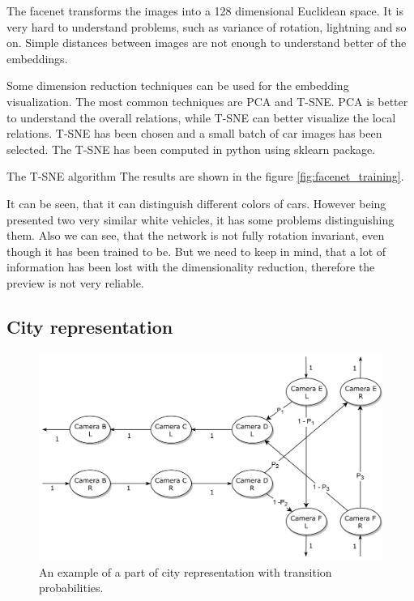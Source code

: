 \documentclass[a4paper,12pt,titlepage, twoside]{article}
\numberwithin{figure}{section}
\begin{document}
The facenet transforms the images into a 128 dimensional Euclidean space. It is very hard to understand problems, such as variance of rotation, lightning and so on. Simple distances between images are not enough to understand better of the embeddings. 

Some dimension reduction techniques can be used for the embedding visualization. The most common techniques are PCA\cite{wold1987principal} and T-SNE\cite{maaten2008visualizing}. PCA is better to understand the overall relations, while T-SNE can better visualize the local relations. T-SNE has been chosen and a small batch of car images has been selected. The T-SNE has been computed in python using sklearn\cite{pedregosa2011scikit} package.

The T-SNE algorithm The results are shown in the figure \ref{fig:facenet_training}.

It can be seen, that it can distinguish different colors of cars. However being presented two very similar white vehicles, it has some problems distinguishing them. Also we can see, that the network is not fully rotation invariant, even though it has been trained to be. But we need to keep in mind, that a lot of information has been lost with the dimensionality reduction, therefore the preview is not very reliable.


\subsection{City representation}
\label{sec:city-representation}
\begin{figure}[h!]
\centering
\includegraphics[width=1\linewidth]{fig/intersection.png}
\caption{An example of a part of city representation with transition probabilities.}
\label{fig:intersection}
\end{figure}
\end{document}
